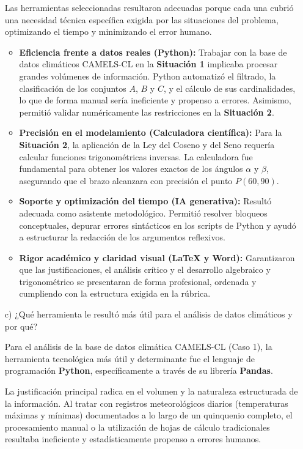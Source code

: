 \documentclass[12pt]{article}
\begin{document}
\begin{itemize}
		Las herramientas seleccionadas resultaron adecuadas porque cada una cubrió una necesidad técnica específica exigida por las situaciones del problema, optimizando el tiempo y minimizando el error humano.

\begin{itemize}
    \item \textbf{Eficiencia frente a datos reales (Python):} Trabajar con la base de datos climáticos CAMELS-CL en la \textbf{Situación 1} implicaba procesar grandes volúmenes de información. Python automatizó el filtrado, la clasificación de los conjuntos $A$, $B$ y $C$, y el cálculo de sus cardinalidades, lo que de forma manual sería ineficiente y propenso a errores. Asimismo, permitió validar numéricamente las restricciones en la \textbf{Situación 2}.
    
    \item \textbf{Precisión en el modelamiento (Calculadora científica):} Para la \textbf{Situación 2}, la aplicación de la Ley del Coseno y del Seno requería calcular funciones trigonométricas inversas. La calculadora fue fundamental para obtener los valores exactos de los ángulos $\alpha$ y $\beta$, asegurando que el brazo alcanzara con precisión el punto $P(60, 90)$.
    
    \item \textbf{Soporte y optimización del tiempo (IA generativa):} Resultó adecuada como asistente metodológico. Permitió resolver bloqueos conceptuales, depurar errores sintácticos en los scripts de Python y ayudó a estructurar la redacción de los argumentos reflexivos.
    
    \item \textbf{Rigor académico y claridad visual (LaTeX y Word):} Garantizaron que las justificaciones, el análisis crítico y el desarrollo algebraico y trigonométrico se presentaran de forma profesional, ordenada y cumpliendo con la estructura exigida en la rúbrica.
\end{itemize}
 \newpage
	\item[c)] ¿Qué herramienta le resultó más útil para el análisis de datos climáticos y por qué?
	
	Para el análisis de la base de datos climática CAMELS-CL (Caso 1), la herramienta tecnológica más útil y determinante fue el lenguaje de programación \textbf{Python}, específicamente a través de su librería \textbf{Pandas}.

La justificación principal radica en el volumen y la naturaleza estructurada de la información. Al tratar con registros meteorológicos diarios (temperaturas máximas y mínimas) documentados a lo largo de un quinquenio completo, el procesamiento manual o la utilización de hojas de cálculo tradicionales resultaba ineficiente y estadísticamente propenso a errores humanos. 


\end{itemize}
\end{document}
